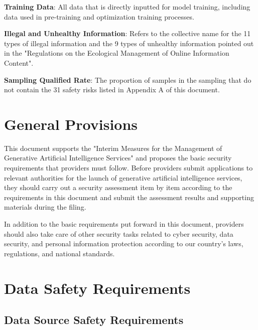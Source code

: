\documentclass{article}
\begin{document}
\textbf{Training Data}: All data that is directly inputted for model training, including data used in pre-training and optimization training processes.

\textbf{Illegal and Unhealthy Information}: Refers to the collective name for the 11 types of illegal information and the 9 types of unhealthy information pointed out in the "Regulations on the Ecological Management of Online Information Content".

\textbf{Sampling Qualified Rate}: The proportion of samples in the sampling that do not contain the 31 safety risks listed in Appendix A of this document.

\section{General Provisions}
This document supports the "Interim Measures for the Management of Generative Artificial Intelligence Services" and proposes the basic security requirements that providers must follow. Before providers submit applications to relevant authorities for the launch of generative artificial intelligence services, they should carry out a security assessment item by item according to the requirements in this document and submit the assessment results and supporting materials during the filing.

In addition to the basic requirements put forward in this document, providers should also take care of other security tasks related to cyber security, data security, and personal information protection according to our country's laws, regulations, and national standards.

\section{Data Safety Requirements}

\subsection{Data Source Safety Requirements}
\end{document}
